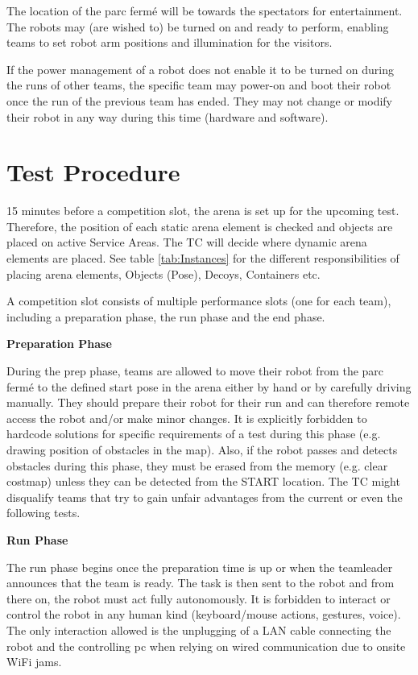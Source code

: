 The location of the parc ferm\'e will be towards the spectators for entertainment.
The robots may (are wished to) be turned on and ready to perform, enabling teams to set robot arm positions and illumination for the visitors. 

If the power management of a robot does not enable it to be turned on during the runs of other teams,
the specific team may power-on and boot their robot once the run of the previous team has ended.
They may not change or modify their robot in any way during this time (hardware and software).

\section{Test Procedure}

15 minutes before a competition slot, the arena is set up for the upcoming test.
Therefore, the position of each static arena element is checked and objects are placed on active 
Service Areas.
The TC will decide where dynamic arena elements are placed. See table \ref{tab:Instances} for the different responsibilities of placing arena elements, Objects (Pose), Decoys, Containers etc.

A competition slot consists of multiple performance slots (one for each team), 
including a preparation phase, the run phase and the end phase.

\textbf{Preparation Phase}

During the prep phase, teams are allowed to move their robot from the parc ferm\'e to the defined start pose in the arena either by hand or by carefully driving manually. They should prepare their robot for their run and can therefore remote access the robot and/or make minor changes.
It is explicitly forbidden to hardcode solutions for specific requirements of a test during this phase (e.g. drawing position of obstacles in the map). Also, if the robot passes and detects obstacles during this phase, they must be erased from the memory (e.g. clear costmap) unless they can be detected from the START location. The TC might disqualify teams that try to gain unfair advantages from the current or even the following tests.

\textbf{Run Phase}

The run phase begins once the preparation time is up or when the teamleader announces that the team is ready. 
The task is then sent to the robot and from there on, the robot must act fully autonomously. 
It is forbidden to interact or control the robot in any human kind (keyboard/mouse actions, gestures, voice). 
The only interaction allowed is the unplugging of a LAN cable connecting the robot and the controlling pc
when relying on wired communication due to onsite WiFi jams.

